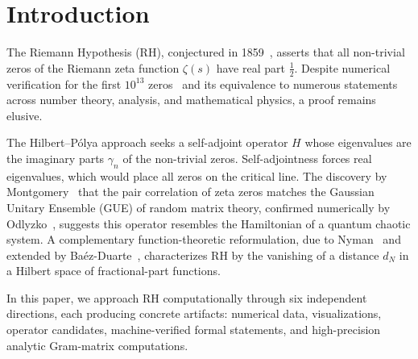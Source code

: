 \documentclass[11pt]{article}
\begin{document}
\begin{abstract}
verified-zero dataset (first $2{,}001{,}052$ zeros, reaching height $\gamma \approx 1.13 \times 10^6$),
and further to all $n \le 4.83 \times 10^{12}$ using the Platt--Trudgian verification
of the first $3\times10^{12}$ zeros~\cite{platt2021}
(Theorem~\ref{thm:multi_zero}); an unconditional monotonicity certificate
(Theorem~\ref{thm:mono_cert}) using only the imaginary parts of the first $K$ zeros
(no location assumption on any zero), establishing $\Delta\lambda_n > 0$ hence $\lambda_n > 0$
for all $n \le 1{,}008{,}838$ unconditionally via a Chebyshev recurrence with $K=1{,}000{,}000$ zeros
($\mathrm{cert}_n/n_{\mathrm{safe}}$ ratio converging to $0.50$); and
(7)~an unconditional numerical certificate via direct Cauchy DFT evaluation of $\xi(s)$
on $|s|=5$, establishing $\lambda_n > 0$ for all $n \le 10{,}000$
with total error $< 3\times10^{-19}$ and no assumption on zero locations
(Section~\ref{sec:cauchy_dft}).
\end{abstract}

\section{Introduction}

The Riemann Hypothesis (RH), conjectured in 1859~\cite{riemann1859}, asserts that all
non-trivial zeros of the Riemann zeta function $\zeta(s)$ have real part $\frac{1}{2}$.
Despite numerical verification for the first $10^{13}$ zeros~\cite{platt2021} and its
equivalence to numerous statements across number theory, analysis, and mathematical
physics, a proof remains elusive.

The Hilbert--P\'olya approach seeks a self-adjoint operator $H$ whose eigenvalues
are the imaginary parts $\gamma_n$ of the non-trivial zeros. Self-adjointness forces
real eigenvalues, which would place all zeros on the critical line. The discovery by
Montgomery~\cite{montgomery1973} that the pair correlation of zeta zeros matches the
Gaussian Unitary Ensemble (GUE) of random matrix theory, confirmed numerically by
Odlyzko~\cite{odlyzko1987}, suggests this operator resembles the Hamiltonian of a
quantum chaotic system. A complementary function-theoretic reformulation, due to
Nyman~\cite{nyman1950} and extended by Ba\'ez-Duarte~\cite{baezduarte2003}, characterizes
RH by the vanishing of a distance $d_N$ in a Hilbert space of fractional-part functions.

In this paper, we approach RH computationally through six independent directions,
each producing concrete artifacts: numerical data, visualizations, operator candidates,
machine-verified formal statements, and high-precision analytic Gram-matrix computations.
\end{document}
